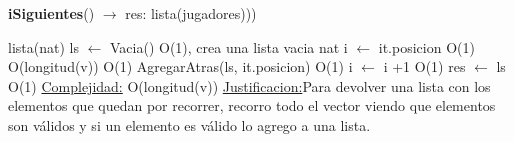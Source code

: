 \begin{Algoritmos}
\begin{algorithm}[H]{\textbf{iSiguientes}() $\to$ res: lista(jugadores)))}
	\begin{algorithmic}[1]
		\State lista(nat) ls $\gets$ Vacia() \Comment O(1), crea una lista vacia
		\State nat i $\gets$ it.posicion \Comment O(1)
		 \Comment O(longitud(v))
			 \Comment O(1)
				\State AgregarAtras(ls, it.posicion) \Comment O(1)
			\EndIf
		\State i $\gets$ i +1 \Comment O(1)		
		\EndWhile
		\State res $\gets$ ls \Comment O(1)
		\medskip
		\Statex \underline{Complejidad:} O(longitud(v))
		\Statex \underline{Justificacion:}Para devolver una lista con los elementos que quedan por recorrer, recorro todo el vector viendo que elementos son válidos y si un elemento es válido lo agrego a una lista.
	\end{algorithmic}
\end{algorithm}

\end{Algoritmos}
